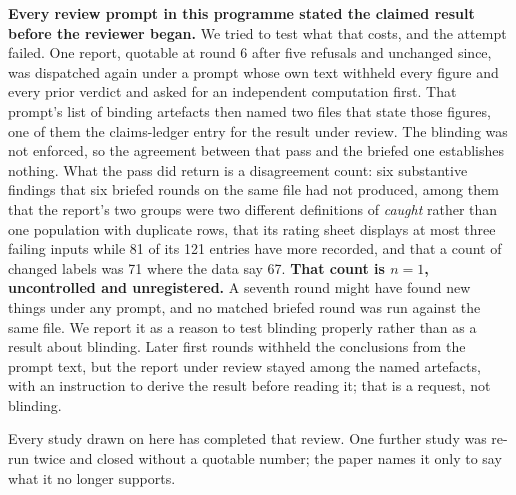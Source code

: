 \textbf{Every review prompt in this programme stated the claimed result before the reviewer
began.} We tried to test what that costs, and the attempt failed. One report, quotable at round 6
after five refusals and unchanged since, was dispatched again under a prompt whose own text
withheld every figure and every prior verdict and asked for an independent computation first.
That prompt's list of binding artefacts then named two files that state those figures, one of
them the claims-ledger entry for the result under review. The blinding was not enforced, so the
agreement between that pass and the briefed one establishes nothing. What the pass did return is a
disagreement count: six substantive findings that six briefed rounds on the same file had not
produced, among them that the report's two groups were two different definitions of
\emph{caught} rather than one population with duplicate rows, that its rating sheet displays at
most three failing inputs while 81 of its 121 entries have more recorded, and that a count of
changed labels was 71 where the data say 67. \textbf{That count is $n=1$, uncontrolled and
unregistered.} A seventh round might have found new things under any prompt, and no matched
briefed round was run against the same file. We report it as a reason to test blinding properly
rather than as a result about blinding. Later first rounds withheld the conclusions from the
prompt text, but the report under review stayed among the named artefacts, with an instruction to
derive the result before reading it; that is a request, not blinding.

Every study drawn on here has completed that review. One further study was re-run twice and closed
without a quotable number; the paper names it only to say what it no longer supports.
